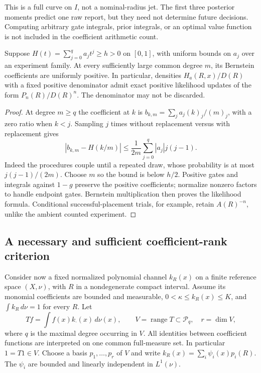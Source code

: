 This is a full curve on $I$, not a nominal-radius jet. The first three posterior moments predict one raw report, but they need not determine future decisions. Computing arbitrary gate integrals, prior integrals, or an optimal value function is not included in the coefficient arithmetic count.

\begin{proposition}\label{prop:elevation}
Suppose $H(t)=\sum_{j=0}^q a_jt^j\ge h>0$ on $[0,1]$, with uniform bounds on $a_j$ over an experiment family. At every sufficiently large common degree $m$, its Bernstein coefficients are uniformly positive. In particular, densities $H_a(R,x)/D(R)$ with a fixed positive denominator admit exact positive likelihood updates of the form $P_n(R)/D(R)^n$. The denominator may not be discarded.
\end{proposition}
\begin{proof}
At degree $m\ge q$ the coefficient at $k$ is $b_{k,m}=\sum_j a_j(k)_j/(m)_j$, with a zero ratio when $k<j$. Sampling $j$ times without replacement versus with replacement gives
\[
 |b_{k,m}-H(k/m)|\le\frac1{2m}\sum_{j=0}^q|a_j|j(j-1).
\]
Indeed the procedures couple until a repeated draw, whose probability is at most $j(j-1)/(2m)$. Choose $m$ so the bound is below $h/2$. Positive gates and integrals against $1-g$ preserve the positive coefficients; normalize nonzero factors to handle endpoint gates. Bernstein multiplication then proves the likelihood formula. Conditional successful-placement trials, for example, retain $A(R)^{-n}$, unlike the ambient counted experiment.
\end{proof}

\subsection{A necessary and sufficient coefficient-rank criterion}
Consider now a fixed normalized polynomial channel $k_R(x)$ on a finite reference space $(X,\nu)$, with $R$ in a nondegenerate compact interval. Assume its monomial coefficients are bounded and measurable, $0<\kappa\le k_R(x)\le K$, and $\int k_R\,d\nu=1$ for every $R$. Let
\[
 T f=\int f(x)k_{\cdot}(x)\,d\nu(x),\qquad V=\operatorname{range}T\subset\mathcal P_q,
 \quad r=\dim V,
\]
where $q$ is the maximal degree occurring in $V$. All identities between coefficient functions are interpreted on one common full-measure set. In particular $1=T1\in V$. Choose a basis $p_1,\ldots,p_r$ of $V$ and write $k_R(x)=\sum_i\psi_i(x)p_i(R)$. The $\psi_i$ are bounded and linearly independent in $L^1(\nu)$.

